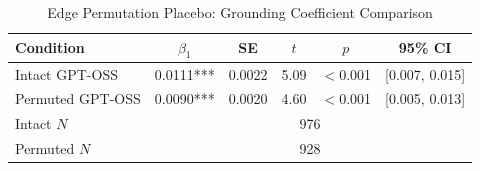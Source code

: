 \begin{table}[htbp]
\centering
\small
\caption{Edge Permutation Placebo: Grounding Coefficient Comparison}
\label{tab:lme_permutation_comparison}
\begin{tabular}{lccccc}
\toprule
Condition & $\beta_1$ & SE & $t$ & $p$ & 95\% CI \\
\midrule
  Intact GPT-OSS & 0.0111*** & 0.0022 & 5.09 & $<$0.001 & [0.007, 0.015] \\
  Permuted GPT-OSS & 0.0090*** & 0.0020 & 4.60 & $<$0.001 & [0.005, 0.013] \\
\midrule
  Intact $N$ & \multicolumn{5}{c}{976} \\
  Permuted $N$ & \multicolumn{5}{c}{928} \\
\bottomrule
\end{tabular}
\end{table}
